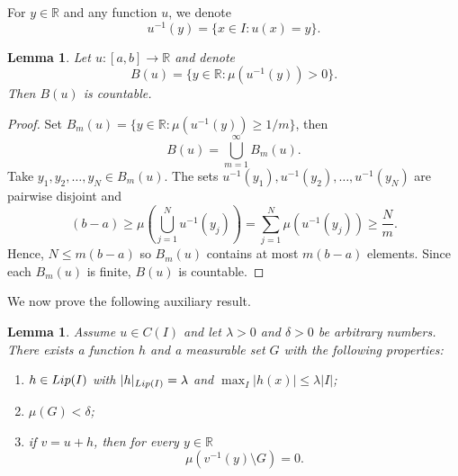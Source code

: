 \documentclass[10pt,a4paper]{amsart}
\newtheorem{lem}[theorem]{Lemma}
\numberwithin{equation}{section}
\begin{document}
For $y\in\mathbb{R}$ and any function $u$, we denote
\begin{equation}
    \nonumber
    u^{-1}(y)=\{x\in I: u(x)=y\}.
\end{equation}
\begin{lem}
    \label{countLemma}
    Let $u:[a,b]\rightarrow\mathbb{R}$ and denote
    \begin{equation}
        \nonumber
        B(u)=\{y\in\mathbb{R}:\mu(u^{-1}(y))>0\}.
    \end{equation}
    Then $B(u)$ is countable.
\end{lem}
\begin{proof}
    Set $B_m(u)=\{y\in\mathbb{R}:\mu(u^{-1}(y))\ge 1/m\}$, then
\begin{equation}
    \nonumber
    B(u)=\bigcup_{m=1}^\infty B_m(u).
\end{equation}
Take $y_1,y_2,\ldots, y_N\in B_m(u)$. The sets $u^{-1}(y_1),u^{-1}(y_2),\ldots, u^{-1}(y_N)$ are pairwise disjoint and
\begin{equation}
    \nonumber
    (b-a)\ge\mu\left(\bigcup_{j=1}^Nu^{-1}(y_j)\right)=\sum_{j=1}^N\mu(u^{-1}(y_j))\ge\frac{N}{m}.
\end{equation}
Hence, $N\le m(b-a)$ so $B_m(u)$ contains at most $m(b-a)$ elements. Since each $B_m(u)$ is finite, $B(u)$ is countable.
\end{proof}
We now prove the following auxiliary result. 
\begin{lem}
    \label{constructiveLemma}
    Assume $u\in C(I)$ and let $\lambda>0$ and $\delta>0$ be arbitrary numbers. There exists a function $h$ and a measurable set $G$ with the following properties:
    \begin{enumerate}
        \item $h\in{\rm Lip}(I)$ with $|h|_{{\rm Lip}(I)}=\lambda$ and $\max_I |h(x)|\le\lambda|I|$;
        \item $\mu(G)<\delta$;
        \item if $v=u+h$, then for every $y\in\mathbb{R}$
    \begin{equation}
        \nonumber
        \mu(v^{-1}(y)\setminus G)=0.
    \end{equation}
    \end{enumerate}
\end{lem}  
\end{document}
